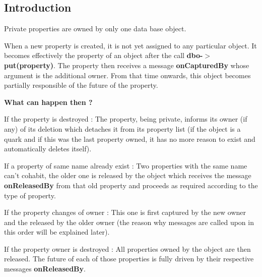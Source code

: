 \hypertarget{classHurricane_1_1PrivateProperty_secPrivatePropertyIntro}{}\subsection{Introduction}\label{classHurricane_1_1PrivateProperty_secPrivatePropertyIntro}
Private properties are owned by only one data base object.

When a new property is created, it is not yet assigned to any particular object. It becomes effectively the property of an object after the call {\bfseries dbo-\/$>$put(property)}. The property then receives a message {\bfseries on\-Captured\-By} whose argument is the additional owner. From that time onwards, this object becomes partially responsible of the future of the property.

{\bfseries What can happen then ?}

If the property is destroyed \-: The property, being private, informs its owner (if any) of its deletion which detaches it from its property list (if the object is a quark and if this was the last property owned, it has no more reason to exist and automatically deletes itself).

If a property of same name already exist \-: Two properties with the same name can't cohabit, the older one is released by the object which receives the message {\bfseries on\-Released\-By} from that old property and proceeds as required according to the type of property.

If the property changes of owner \-: This one is first captured by the new owner and the released by the older owner (the reason why messages are called upon in this order will be explained later).

If the property owner is destroyed \-: All properties owned by the object are then released. The future of each of those properties is fully driven by their respective messages {\bfseries on\-Released\-By}. 

